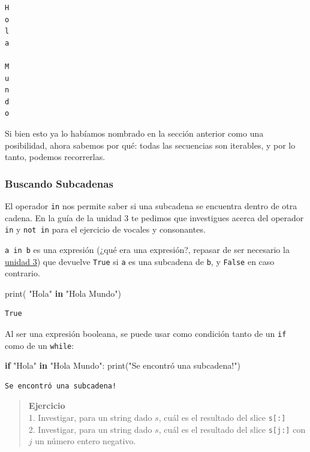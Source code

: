 \documentclass[
  letterpaper,
  DIV=11,
  numbers=noendperiod]{scrreprt}
\newenvironment{Shaded}{\begin{snugshade}}{\end{snugshade}}
\newcommand{\BuiltInTok}[1]{\textcolor[rgb]{0.00,0.23,0.31}{#1}}
\newcommand{\ControlFlowTok}[1]{\textcolor[rgb]{0.00,0.23,0.31}{\textbf{#1}}}
\newcommand{\KeywordTok}[1]{\textcolor[rgb]{0.00,0.23,0.31}{\textbf{#1}}}
\newcommand{\NormalTok}[1]{\textcolor[rgb]{0.00,0.23,0.31}{#1}}
\newcommand{\StringTok}[1]{\textcolor[rgb]{0.13,0.47,0.30}{#1}}
\begin{document}
\begin{verbatim}
H
o
l
a
 
M
u
n
d
o
\end{verbatim}

Si bien esto ya lo habíamos nombrado en la sección anterior como una
posibilidad, ahora sabemos por qué: todas las secuencias son iterables,
y por lo tanto, podemos recorrerlas.

\subsubsection{Buscando Subcadenas}\label{buscando-subcadenas}

El operador \texttt{in} nos permite saber si una subcadena se encuentra
dentro de otra cadena. En la guía de la unidad 3 te pedimos que
investigues acerca del operador \texttt{in} y \texttt{not\ in} para el
ejercicio de vocales y consonantes.

\texttt{a\ in\ b} es una expresión (¿qué era una expresión?, repasar de
ser necesario la \hyperref[expresiones-booleanas]{unidad 3}) que
devuelve \texttt{True} si \texttt{a} es una subcadena de \texttt{b}, y
\texttt{False} en caso contrario.

\begin{Shaded}
\begin{Highlighting}[]
\BuiltInTok{print}\NormalTok{( }\StringTok{"Hola"} \KeywordTok{in} \StringTok{"Hola Mundo"}\NormalTok{)}
\end{Highlighting}
\end{Shaded}

\begin{verbatim}
True
\end{verbatim}

Al ser una expresión booleana, se puede usar como condición tanto de un
\texttt{if} como de un \texttt{while}:

\begin{Shaded}
\begin{Highlighting}[]
\ControlFlowTok{if} \StringTok{"Hola"} \KeywordTok{in} \StringTok{"Hola Mundo"}\NormalTok{:}
    \BuiltInTok{print}\NormalTok{(}\StringTok{"Se encontró una subcadena!"}\NormalTok{)}
\end{Highlighting}
\end{Shaded}

\begin{verbatim}
Se encontró una subcadena!
\end{verbatim}

\begin{quote}
\textbf{Ejercicio}\\
1. Investigar, para un string dado \(s\), cuál es el resultado del slice
\texttt{s{[}:{]}}\\
2. Investigar, para un string dado \(s\), cuál es el resultado del slice
\texttt{s{[}j:{]}} con \(j\) un número entero negativo.
\end{quote}
\end{document}
